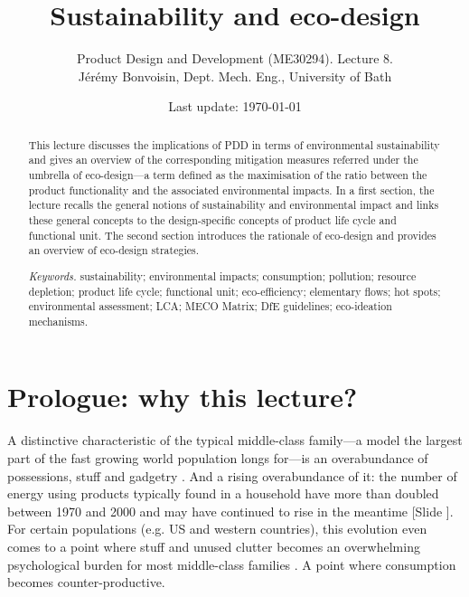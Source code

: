 \documentclass{article}
\newcounter{slide}
\newcommand{\subtitle}[1]{%
  \posttitle{%
    \par\end{center}
    \begin{center}\large#1\end{center}
    \vskip0.5em}%
}
\begin{document}
\title{Sustainability and eco-design}

\author{Product Design and Development (ME30294). Lecture 8. \\ Jérémy Bonvoisin, Dept. Mech. Eng., University of Bath}
\date{Last update: \today}

\maketitle

\begin{abstract}
This lecture discusses the implications of PDD in terms of environmental sustainability and gives an overview of the corresponding mitigation measures referred under the umbrella of eco-design---a term defined as the maximisation of the ratio between the product functionality and the associated environmental impacts. In a first section, the lecture recalls the general notions of sustainability and environmental impact and links these general concepts to the design-specific concepts of product life cycle and functional unit. The second section introduces the rationale of eco-design and provides an overview of eco-design strategies. 

{{\it Keywords.} sustainability; environmental impacts; consumption; pollution; resource depletion; product life cycle; functional unit; eco-efficiency; elementary flows; hot spots; environmental assessment; LCA; MECO Matrix; DfE guidelines; eco-ideation mechanisms.}
\end{abstract}

\tableofcontents

\section{Prologue: why this lecture?}
\label{sec:prologue}
A distinctive characteristic of the typical middle-class family---a model the largest part of the fast growing world population longs for---is an overabundance of possessions, stuff and gadgetry \cite{menzelMaterialWorldGlobal1995}. And a rising overabundance of it: the number of energy using products typically found in a household have more than doubled between 1970 and 2000 \cite{owenRiseMachinesReview2006} and may have continued to rise in the meantime {\color{blue}[Slide ]}. For certain populations (e.g. US and western countries), this evolution even comes to a point where stuff and unused clutter becomes an overwhelming psychological burden for most middle-class families \cite{arnoldChangingAmericanHome2007}. A point where consumption becomes counter-productive.
\end{document}
